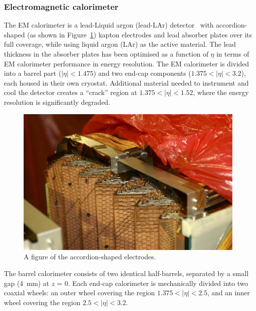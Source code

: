 	\subsubsection{Electromagnetic calorimeter} 
	The EM calorimeter is a lead-Liquid argon (lead-LAr) detector~\cite{ATLAS-TDR-02} 
	with accordion-shaped (as shown in Figure~\ref{fig:accordion}) kapton electrodes and lead 
	absorber plates over its full coverage, while using liquid argon (LAr) as the active 
	material. 
	The lead thickness in the absorber plates has been optimised as a function of $\eta$ 
	in terms of EM calorimeter performance in energy resolution. 
	The EM calorimeter is divided into a barrel part ($|\eta| < 1.475$) 
	and two end-cap components ($1.375 < |\eta|< 3.2$), each housed 
	in their own cryostat. Additional material needed to instrument
	and cool the detector creates a ``crack'' region at $1.375 < |\eta|< 1.52$, where the 
	energy resolution is significantly degraded.
	
	\begin{figure}[bht]
		\begin{centering}	
		\includegraphics[width=.6\textwidth]{Detector/plots/accordion.jpg}
		\caption{A figure of the accordion-shaped electrodes.}
		\label{fig:accordion}
		\end{centering}
	\end{figure}
	The barrel calorimeter 	consists of two identical half-barrels, 
	separated by a small gap (4~mm) at $z$ = 0. 
	Each end-cap calorimeter is mechanically divided into two coaxial wheels: 
	an outer wheel covering the region $1.375 < |\eta|< 2.5$, and an inner wheel 
	covering the region $2.5 < |\eta|< 3.2$.
	
